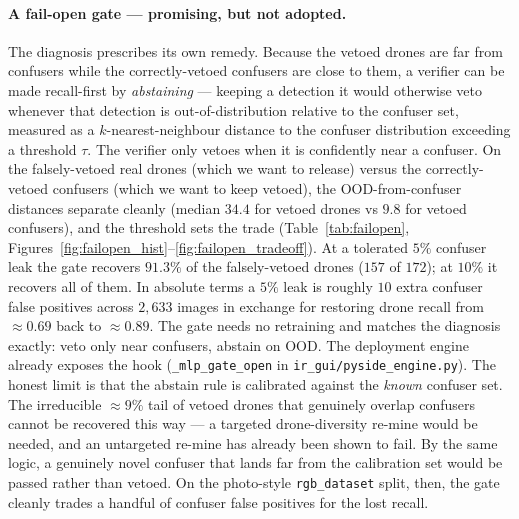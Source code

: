 \documentclass[12pt,a4paper,oneside,openright]{book}
\begin{document}
\paragraph{A fail-open gate --- promising, but not adopted.}
The diagnosis prescribes its own remedy. Because the vetoed drones are far from confusers while the correctly-vetoed confusers are close to them, a verifier can be made recall-first by \emph{abstaining} --- keeping a detection it would otherwise veto whenever that detection is out-of-distribution relative to the confuser set, measured as a $k$-nearest-neighbour distance to the confuser distribution exceeding a threshold $\tau$. The verifier only vetoes when it is confidently near a confuser. On the falsely-vetoed real drones (which we want to release) versus the correctly-vetoed confusers (which we want to keep vetoed), the OOD-from-confuser distances separate cleanly (median $34.4$ for vetoed drones vs $9.8$ for vetoed confusers), and the threshold sets the trade (Table~\ref{tab:failopen}, Figures~\ref{fig:failopen_hist}--\ref{fig:failopen_tradeoff}). At a tolerated $5\%$ confuser leak the gate recovers $91.3\%$ of the falsely-vetoed drones ($157$ of $172$); at $10\%$ it recovers all of them. In absolute terms a $5\%$ leak is roughly $10$ extra confuser false positives across $2{,}633$ images in exchange for restoring drone recall from $\approx 0.69$ back to $\approx 0.89$. The gate needs no retraining and matches the diagnosis exactly: veto only near confusers, abstain on OOD. The deployment engine already exposes the hook (\texttt{\_mlp\_gate\_open} in \texttt{ir\_gui/pyside\_engine.py}). The honest limit is that the abstain rule is calibrated against the \emph{known} confuser set. The irreducible $\approx 9\%$ tail of vetoed drones that genuinely overlap confusers cannot be recovered this way --- a targeted drone-diversity re-mine would be needed, and an untargeted re-mine has already been shown to fail. By the same logic, a genuinely novel confuser that lands far from the calibration set would be passed rather than vetoed. On the photo-style \texttt{rgb\_dataset} split, then, the gate cleanly trades a handful of confuser false positives for the lost recall.
\end{document}

